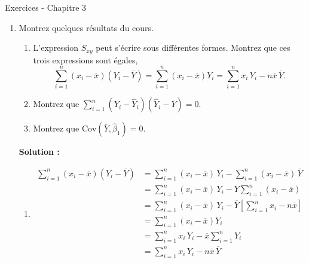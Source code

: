 \documentclass[letter, 11pt]{article}
\newcommand{\prof}[1]{\ifdefined\avecsolutions\par{\color{blue}\textbf{Solution :} #1}\par\fi}
\begin{document}
\vspace*{0.01 cm}
\begin{center}
{\Large Exercices - Chapitre 3}
\end{center}




\begin{enumerate}[leftmargin=*, wide, label=\bf Exercice \arabic*:]

\item Montrez quelques résultats du cours.
\begin{enumerate}
    \item L'expression $S_{xy}$ peut s'écrire sous différentes formes. Montrez que ces trois expressions sont égales,
    $$\sum\limits_{i=1}^n \left(x_i-\overline x\right)\left(Y_i-\overline Y\right) = \sum\limits_{i=1}^n \left(x_i-\overline x\right)Y_i = \sum\limits_{i=1}^n x_i\,Y_i - n\overline x\,\overline Y.$$
    \item Montrez que $\sum\limits_{i=1}^n (Y_i-\widehat Y_i)(\widehat Y_i-\overline Y) = 0$.
    \item Montrez que $\text{Cov}(\overline Y,\widehat\beta_1)=0$.
    \end{enumerate}

\prof{\begin{enumerate}
\item $$\begin{array}{ll}
    \sum\limits_{i=1}^n (x_i-\overline x)(Y_i-\overline Y)
    &= \sum\limits_{i=1}^n (x_i-\overline x)\,Y_i-\sum\limits_{i=1}^n(x_i-\overline x)\,\overline Y\\[3mm]
    &= \sum\limits_{i=1}^n (x_i-\overline x)\,Y_i-\overline Y \sum\limits_{i=1}^n(x_i-\overline x)\,\\[3mm]
    &= \sum\limits_{i=1}^n (x_i-\overline x)\,Y_i-\overline Y \left[\sum\limits_{i=1}^n x_i-n\overline x\right]\,\\[3mm]
     &= \sum\limits_{i=1}^n (x_i-\overline x)Y_i \\[3mm]
     &= \sum\limits_{i=1}^n x_i\,Y_i-\overline x\sum\limits_{i=1}^n Y_i \\[3mm]
    &= \sum\limits_{i=1}^n x_i\,Y_i - n\overline x\,\overline Y\\
    \end{array}$$


\end{enumerate}}
\end{enumerate}
\end{document}
